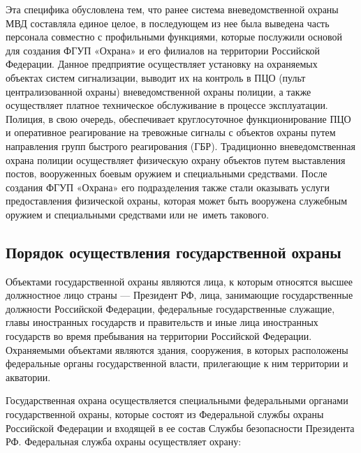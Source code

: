 \documentclass[a4paper,12pt,fleqn]{article} %
\begin{document}
Эта специфика обусловлена тем, что ранее система вневедомственной охраны МВД составляла единое целое, в последующем из нее была выведена часть персонала совместно с профильными функциями, которые послужили основой для создания ФГУП «Охрана» и его филиалов на территории Российской Федерации. Данное предприятие осуществляет установку на охраняемых объектах систем сигнализации, выводит их на контроль в ПЦО (пульт централизованной охраны) вневедомственной охраны полиции, а также осуществляет платное техническое обслуживание в процессе эксплуатации. Полиция, в свою очередь, обеспечивает круглосуточное функционирование ПЦО и оперативное реагирование на тревожные сигналы с объектов охраны путем направления групп быстрого реагирования (ГБР). Традиционно вневедомственная охрана полиции осуществляет физическую охрану объектов путем выставления постов, вооруженных боевым оружием и специальными средствами. После создания ФГУП «Охрана» его подразделения также стали оказывать услуги предоставления физической охраны, которая может быть вооружена служебным оружием и специальными средствами или не~иметь такового.

\subsection{Порядок осуществления государственной охраны}


Объектами государственной охраны являются лица, к которым относятся высшее должностное лицо страны --- Президент РФ, лица, занимающие государственные должности Российской Федерации, федеральные государственные служащие, главы иностранных государств и правительств и иные лица иностранных государств во время пребывания на территории Российской Федерации. Охраняемыми объектами являются здания, сооружения, в которых расположены федеральные органы государственной власти, прилегающие к ним территории и акватории.

Государственная охрана осуществляется специальными федеральными органами государственной охраны, которые состоят из Федеральной службы охраны Российской Федерации и входящей в ее состав Службы безопасности Президента РФ. Федеральная служба охраны осуществляет охрану: 
\end{document}
